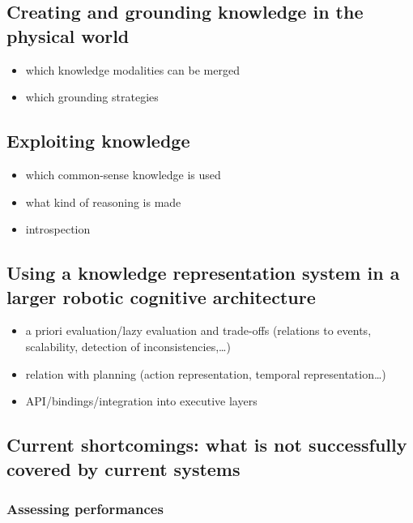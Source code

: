 \documentclass[a4paper, twocolumn]{article}
\begin{document}
\subsection{Creating and grounding knowledge in the physical world}
\label{sect|summary-grounding}


\begin{itemize}
	\item which knowledge modalities can be merged
	\item which grounding strategies
\end{itemize}


\subsection{Exploiting knowledge}
\label{sect|summary-knowledge-sources-reasoning}

\begin{itemize}
	\item which common-sense knowledge is used
	\item what kind of reasoning is made
	\item introspection
\end{itemize}


\subsection{Using a knowledge representation system in a larger robotic cognitive architecture}
\label{sect|summary-integration}

\begin{itemize}
	\item a priori evaluation/lazy evaluation and trade-offs (relations to events, scalability, detection of inconsistencies,\ldots)
	\item relation with planning (action representation, temporal representation\ldots)
	\item API/bindings/integration into executive layers
\end{itemize}

\subsection{Current shortcomings: what is not successfully covered by current systems}

\subsubsection{Assessing performances}
\end{document}
